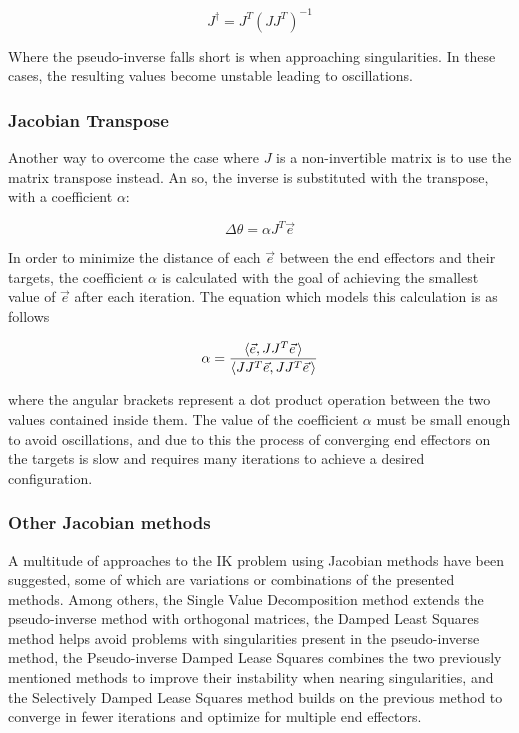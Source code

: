 \begin{equation}
    J^\dagger = J^T (J J^T)^{-1}
\end{equation}

Where the pseudo-inverse falls short is when approaching singularities. In these
cases, the resulting values become unstable leading to oscillations.

\subsubsection{Jacobian Transpose}
Another way to overcome the case where \(J\) is a non-invertible matrix is to
use the matrix transpose instead. An so, the inverse is substituted with the
transpose, with a coefficient \(\alpha\):

\begin{equation}
    \Delta \theta = \alpha J^T \vec{e}
\end{equation}

In order to minimize the distance of each \(\vec{e}\) between  the end effectors and
their targets, the coefficient \(\alpha\) is calculated with the goal of
achieving the smallest value of \(\vec{e}\) after each iteration. The equation
which models this calculation is as follows

\begin{equation}
    \alpha = \frac
        {
            \langle\vec{e}, J J^T \pvec{e}\rangle
        }
        {
            \langle J J^T \vec{e},J J^T \pvec{e} \rangle
        }
\end{equation}

where the angular brackets represent a dot product operation between the two
values contained inside them. The value of the coefficient \(\alpha\) must be
small enough to avoid oscillations, and due to this the process of converging
end effectors on the targets is slow and requires many iterations to achieve
a desired configuration.

\subsubsection{Other Jacobian methods}
A multitude of approaches to the IK problem using Jacobian methods have been
suggested, some of which are variations or combinations of the presented
methods. Among others, the Single Value Decomposition method extends the
pseudo-inverse method with orthogonal matrices, the Damped Least Squares method
helps avoid problems with singularities present in the pseudo-inverse method,
the Pseudo-inverse Damped Lease Squares combines the two previously mentioned
methods to improve their instability when nearing singularities, and the
Selectively Damped Lease Squares method builds on the previous method to
converge in fewer iterations and optimize for multiple end effectors.

